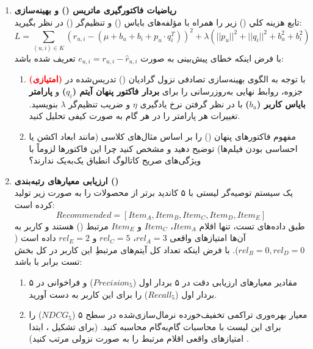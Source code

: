 \documentclass[a4paper,12pt]{article}
\begin{document}
\begin{enumerate}
\item \textbf{ریاضیات فاکتورگیری ماتریس () و بهینه‌سازی }
\\
تابع هزینه کلي () زیر را همراه با مؤلفه‌های بایاس () و تنظیم‌گر () در نظر بگیرید:
$$L = \sum_{(u,i) \in K} \left( r_{u,i} - (\mu + b_u + b_i + p_u \cdot q_i^T) \right)^2 + \lambda \left( ||p_u||^2 + ||q_i||^2 + b_u^2 + b_i^2 \right)$$
با فرض اینکه خطای پیش‌بینی به صورت $e_{u,i} = r_{u,i} - \hat{r}_{u,i}$ تعریف شده باشد:
\begin{enumerate}
\item \textbf{\textcolor{red}{(امتیازی)}} با توجه به الگوی بهینه‌سازی تصادفی نزول گرادیان () تدریس‌شده در جزوه، روابط نهایی به‌روزرسانی را برای \textbf{بردار فاکتور پنهان آیتم ($q_i$)} و \textbf{پارامتر بایاس کاربر ($b_u$)} با در نظر گرفتن نرخ یادگیری $\eta$ و ضریب تنظیم‌گر $\lambda$ بنویسید. تغییرات هر پارامتر را در هر گام به صورت کیفی تحلیل کنید.    \item مفهوم فاکتورهای پنهان () را بر اساس مثال‌های کلاسی (مانند ابعاد اکشن یا احساسی بودن فیلم‌ها) توضیح دهید  و مشخص کنید چرا این فاکتورها لزوماً با ویژگی‌های صریح کاتالوگ انطباق یک‌به‌یک ندارند؟ 
\end{enumerate}

\item \textbf{ارزیابی معیارهای رتبه‌بندی ()}
\\
یک سیستم توصیه‌گر لیستی با ۵ کاندید برتر از محصولات را به صورت زیر تولید کرده است:
$$Recommended = [Item_A, Item_B, Item_C, Item_D, Item_E]$$
طبق داده‌های تست، تنها اقلام $Item_A$، $Item_C$ و $Item_E$ مرتبط () هستند و کاربر به آن‌ها امتیازهای واقعی $rel_A = 3$، $rel_C = 5$ و $rel_E = 2$ داده است ($rel_B = 0, rel_D = 0$). با فرض اینکه تعداد کل آیتم‌های مرتبطِ این کاربر در کل بخش تست برابر با  باشد:
\begin{enumerate}
    \item مقادیر معیارهای ارزیابی دقت در ۵ بردار اول ($Precision_5$) و فراخوانی در ۵ بردار اول ($Recall_5$) را برای این کاربر به دست آورید.
    \item معیار بهره‌وری تراکمی تخفیف‌خورده نرمال‌سازی‌شده در سطح ۵ ($NDCG_5$) را برای این لیست با محاسبات گام‌به‌گام محاسبه کنید. (برای تشکیل ، ابتدا امتیازهای واقعی اقلام مرتبط را به صورت نزولی مرتب کنید) .
\end{enumerate}


\end{enumerate}
\end{document}
